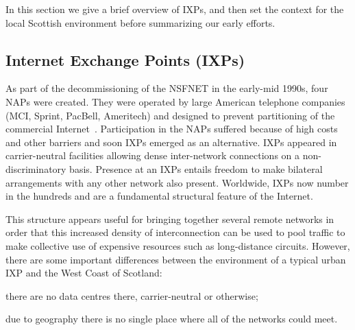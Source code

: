 In this section we give a brief overview of \acp{IXP}, and then set the context for the local Scottish environment before summarizing our early efforts.

\subsection{Internet Exchange Points (IXPs)}

As part of the decommissioning of the \ac{NSFNET} in the early-mid
1990s, four \acp{NAP} were created. They were operated by large
American telephone companies (MCI, Sprint, PacBell, Ameritech) and
designed to prevent partitioning of the commercial
Internet~\cite{hayes1997computing,Ager:2012}. Participation in
the \acp{NAP} suffered because of high costs and other barriers and
soon \acp{IXP} emerged as an alternative. \acp{IXP} appeared in
carrier-neutral facilities allowing dense inter-network connections on
a non-discriminatory basis. Presence at an \acp{IXP} entails freedom
to make bilateral arrangements with any other network also
present. Worldwide, \acp{IXP} now number in the hundreds and are a
fundamental structural feature of the Internet.



This structure appears useful for bringing together several remote
networks in order that this increased density of interconnection can
be used to pool traffic to make collective use of expensive resources
such as long-distance circuits. However, there are some important
differences between the environment of a typical urban \ac{IXP} and
the West Coast of Scotland:
\begin{inparaenum}[(i)]
  \item there are no data centres there, carrier-neutral or otherwise;
  \item due to geography there is no single place where all of the
    networks could meet.
\end{inparaenum}

